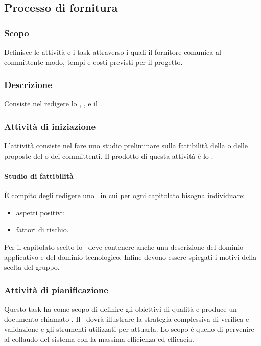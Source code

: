 \documentclass[12pt,a4paper]{article}
\begin{document}
\subsection{Processo di fornitura}

\subsubsection{Scopo}
Definisce le attività e i task attraverso i quali il fornitore comunica al committente modo, tempi e costi previsti per il progetto.

\subsubsection{Descrizione}
Consiste nel redigere lo \SdF, \PdQ, e il \PdP.

\subsubsection{Attività di iniziazione}
L'attività consiste nel fare uno studio preliminare sulla fattibilità della o delle proposte del o dei committenti. Il prodotto di questa attività è lo \SdF.

\paragraph{Studio di fattibilità}
È compito degli \ANpl{} redigere uno \SdF\ in cui per ogni capitolato bisogna individuare:
\begin{itemize}
	\item aspetti positivi;
	\item fattori di rischio.
\end{itemize}
Per il capitolato scelto lo \SdF\ deve contenere anche una descrizione del dominio applicativo e del dominio tecnologico. Infine devono essere spiegati i motivi della scelta del gruppo.

\subsubsection{Attività di pianificazione}

Questo task ha come scopo di definire gli obiettivi di qualità e produce un documento chiamato \PdQ. Il \PdQ\ dovrà illustrare la strategia complessiva di verifica e validazione e gli strumenti utilizzati per attuarla. Lo scopo è quello di pervenire al collaudo del sistema con la massima efficienza ed efficacia.
\end{document}
